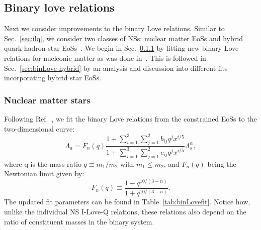 \documentclass[prd,twocolumn,nofootinbib,superscriptaddress,amsmath,amssymb]{revtex4-1}
\begin{document}
\subsection{Binary love relations}\label{sec:binary}
Next we consider improvements to the binary Love relations.
Similar to Sec.~\ref{sec:ilq}, we consider two classes of NSs: nuclear matter EoSs and hybrid quark-hadron star EoSs~\cite{Paschalidis2018,Alford:2017qgh,1971SvA....15..347S,Zdunik:2012dj,Alford:2013aca}.
We begin in Sec.~\ref{sec:binLove-nuclear} by fitting new binary Love relations for nucleonic matter as was done in~\cite{Yagi:binLove}.
This is followed in Sec.~\ref{sec:binLove-hybrid} by an analysis and discussion into different fits incorporating hybrid star EoSs.

\subsubsection{Nuclear matter stars}\label{sec:binLove-nuclear}
Following Ref.~\cite{Yagi:binLove}, we fit the binary Love relations from the constrained EoSs to the two-dimensional curve:
\begin{equation}\label{eq:binLovefit}
\Lambda_a=F_n(q) \frac{1+ \sum_{i=1}^3 \sum_{j=1}^2 b_{ij}q^j x^{i/5}}{1 + \sum_{i=1}^3 \sum_{j=1}^2 c_{ij}q^j x^{i/5}} \Lambda_s^{\alpha},
\end{equation}
where q is the mass ratio $q \equiv m_1/m_2$ with $m_1 \leq m_2$, and $F_n(q)$ being the Newtonian limit given by:
\begin{equation}
F_n(q) \equiv \frac{1-q^{10/(3-n)}}{1+q^{10/(3-n)}}.
\end{equation}
The updated fit parameters can be found in Table~\ref{tab:binLovefit}.
Notice how, unlike the individual NS I-Love-Q relations, these relations also depend on the ratio of constituent masses in the binary system.
\end{document}
